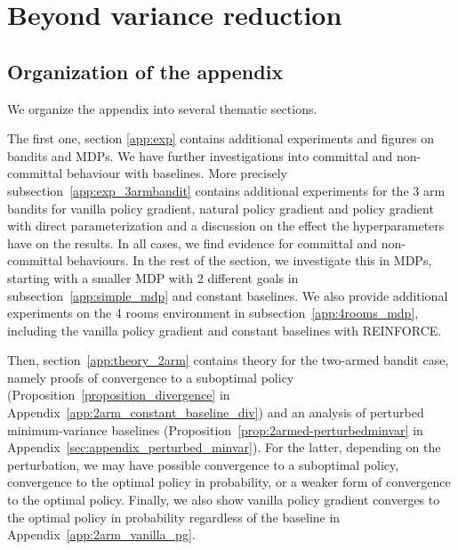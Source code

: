 \chapter{Beyond variance reduction}


\section*{Organization of the appendix}

We organize the appendix into several thematic sections. 

The first one, section \ref{app:exp} contains additional experiments and figures on bandits and MDPs. 
We have further investigations into committal and non-committal behaviour with baselines. 
More precisely subsection~\ref{app:exp_3armbandit} contains additional experiments for the 3 arm bandits for vanilla policy gradient, natural policy gradient and policy gradient with direct parameterization and a discussion on the effect the hyperparameters have on the results. In all cases, we find evidence for committal and non-committal behaviours. 
In the rest of the section, we investigate this in MDPs, starting with a smaller MDP with 2 different goals in subsection~\ref{app:simple_mdp} and constant baselines. We also provide additional experiments on the 4 rooms environment in subsection~\ref{app:4rooms_mdp}, including the vanilla policy gradient and constant baselines with REINFORCE. 

Then, section~\ref{app:theory_2arm} contains theory for the two-armed bandit case, namely proofs of convergence to a suboptimal policy (Proposition~\ref{proposition_divergence} in Appendix~\ref{app:2arm_constant_baseline_div}) and an analysis of perturbed minimum-variance baselines (Proposition~\ref{prop:2armed-perturbedminvar} in Appendix~\ref{sec:appendix_perturbed_minvar}). For the latter, depending on the perturbation, we may have possible convergence to a suboptimal policy, convergence to the optimal policy in probability, or a weaker form of convergence to the optimal policy. Finally, we also show vanilla policy gradient converges to the optimal policy in probability regardless of the baseline in Appendix~\ref{app:2arm_vanilla_pg}. 

